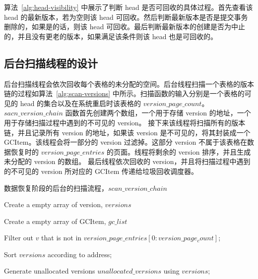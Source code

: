 算法~\ref{alg:head-visibility} 中展示了判断 head 是否可回收的具体过程。首先查看该 head 的最新版本，若为空则该 head 可回收。然后判断最新版本是否是提交事务删除的，如果是的话，则该 head 可回收。最后判断最新版本的创建是否为中止的，并且没有更老的版本，如果满足该条件则该 head 也是可回收的。

\subsection{后台扫描线程的设计}
\label{ssec:background-scan}

后台扫描线程会依次回收每个表格的未分配的空间。后台线程扫描一个表格的版本链的过程如算法~\ref{alg:scan-versions} 中所示。扫描函数的输入分别是一个表格的可见的 head 的集合以及在系统重启时该表格的 $version\_page\_count$。$sacn\_version\_chain$ 函数首先创建两个数组，一个用于存储 version 的地址，一个用于存储扫描过程中遇到的不可见的 version。
接下来该线程将扫描所有的版本链，并且记录所有 version 的地址，如果该 version 是不可见的，将其封装成一个 GCItem。该线程会将一部分的 version 过滤掉。这部分 version 不属于该表格在数据恢复时的 $version\_page\_entries$ 的页面。线程将剩余的 version 排序，并且生成未分配的 version 的数组。
最后线程依次回收的 version，并且将扫描过程中遇到的不可见的 version 所对应的 GCItem 传递给垃圾回收调度器。


\begin{algorithm}[ht]
    \caption{数据恢复阶段的后台的扫描流程，$scan\_version\_chain$}
    \label{alg:scan-versions}
    \BlankLine

    Create a empty array of version, $versions$

    Create a empty array of GCItem, $gc\_list$


    Filter out $v$ that is not in $version\_page\_entries[0:version\_page_count]$;

    Sort $versions$ according to address;


    Generate unallocated versions $unallocated\_versions$ using $versions$;



\end{algorithm}


